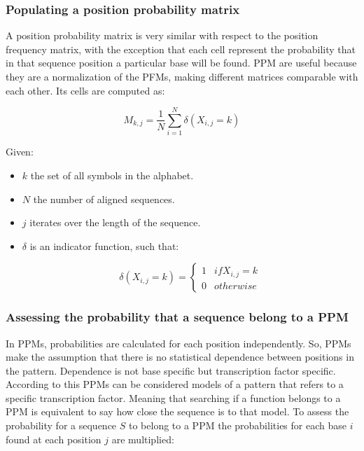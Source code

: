 		\subsubsection{Populating a position probability matrix}
		A position probability matrix is very similar with respect to the position frequency matrix, with the exception that each cell represent the probability that in that sequence position a particular base will be found.
		PPM are useful because they are a normalization of the PFMs, making different matrices comparable with each other.
		Its cells are computed as:

		$$M_{k,j} = \frac{1}{N}\sum\limits_{i=1}^N\delta(X_{i,j} = k)$$

		Given:

		\begin{multicols}{2}
			\begin{itemize}
				\item $k$ the set of all symbols in the alphabet.
				\item $N$ the number of aligned sequences.
				\item $j$ iterates over the length of the sequence.
				\item $\delta$ is an indicator function, such that:

					$$\delta(X_{i,j} = k) = \begin{cases}1 &if X_{i,j} = k \\0 & otherwise\end{cases}$$

			\end{itemize}
		\end{multicols}

		\subsubsection{Assessing the probability that a sequence belong to a PPM}
		In PPMs, probabilities are calculated for each position independently.
		So, PPMs make the assumption that there is no statistical dependence between positions in the pattern.
		Dependence is not base specific but transcription factor specific.
		According to this PPMs can be considered models of a pattern that refers to a specific transcription factor.
		Meaning that searching if a function belongs to a PPM is equivalent to say how close the sequence is to that model.
		To assess the probability for a sequence $S$ to belong to a PPM the probabilities for each base $i$ found at each position $j$ are multiplied:

